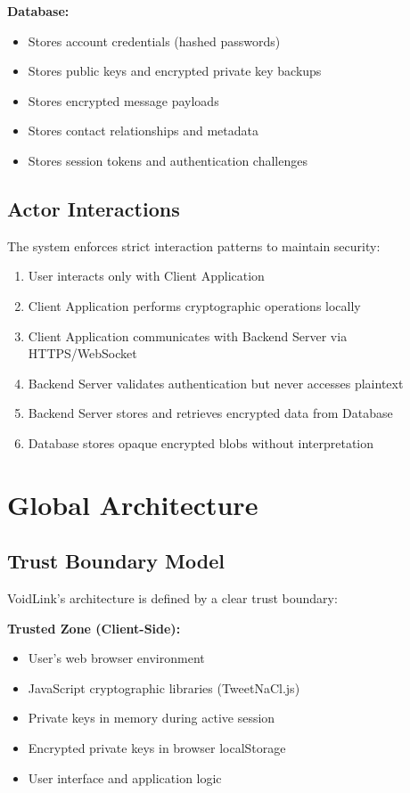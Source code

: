 \textbf{Database:}
\begin{itemize}
    \item Stores account credentials (hashed passwords)
    \item Stores public keys and encrypted private key backups
    \item Stores encrypted message payloads
    \item Stores contact relationships and metadata
    \item Stores session tokens and authentication challenges
\end{itemize}

\subsection{Actor Interactions}

The system enforces strict interaction patterns to maintain security:

\begin{enumerate}
    \item User interacts only with Client Application
    \item Client Application performs cryptographic operations locally
    \item Client Application communicates with Backend Server via HTTPS/WebSocket
    \item Backend Server validates authentication but never accesses plaintext
    \item Backend Server stores and retrieves encrypted data from Database
    \item Database stores opaque encrypted blobs without interpretation
\end{enumerate}

\section{Global Architecture}

\subsection{Trust Boundary Model}

VoidLink's architecture is defined by a clear trust boundary:

\textbf{Trusted Zone (Client-Side):}
\begin{itemize}
    \item User's web browser environment
    \item JavaScript cryptographic libraries (TweetNaCl.js)
    \item Private keys in memory during active session
    \item Encrypted private keys in browser localStorage
    \item User interface and application logic
\end{itemize}


